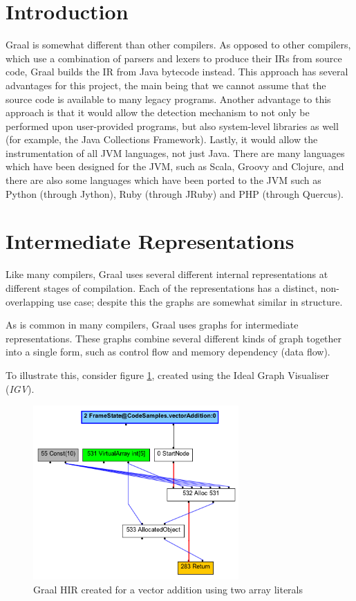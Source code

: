 \section{Introduction} \label{sec:graal/introduction}
Graal is somewhat different than other compilers. As opposed to other compilers, which use a combination of parsers and lexers to produce their IRs from source code, Graal builds the IR from Java bytecode instead. This approach has several advantages for this project, the main being that we cannot assume that the source code is available to many legacy programs. Another advantage to this approach is that it would allow the detection mechanism to not only be performed upon user-provided programs, but also system-level libraries as well (for example, the Java Collections Framework). Lastly, it would allow the instrumentation of all JVM languages, not just Java. There are many languages which have been designed for the JVM, such as Scala, Groovy and Clojure, and there are also some languages which have been ported to the JVM such as Python (through Jython), Ruby (through JRuby) and PHP (through Quercus).

\section{Intermediate Representations} \label{sec:graal/ir}
Like many compilers, Graal uses several different internal representations at different stages of compilation. Each of the representations has a distinct, non-overlapping use case; despite this the graphs are somewhat similar in structure.

As is common in many compilers, Graal uses graphs for intermediate representations. These graphs combine several different kinds of graph together into a single form, such as control flow and memory dependency (data flow).

To illustrate this, consider figure \ref{fig:vector-inline}, created using the Ideal Graph Visualiser (\textit{IGV}).

\begin{figure}
	\centering
	\includegraphics[width=0.7\textwidth]{graphics/loop-inline.png}
	\caption{Graal HIR created for a vector addition using two array literals}
	\label{fig:vector-inline}
\end{figure}

